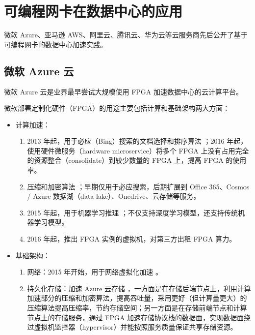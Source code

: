 \section{可编程网卡在数据中心的应用}
\label{background:sec:application}

微软 Azure、亚马逊 AWS、阿里云、腾讯云、华为云等云服务商先后公开了基于可编程网卡的数据中心加速实践。

\subsection{微软 Azure 云}

微软 Azure 云是业界最早尝试大规模使用 FPGA 加速数据中心的云计算平台。

微软部署定制化硬件（FPGA）的用途主要包括计算和基础架构两大方面：

\begin{itemize}
	\item 计算加速：
	\begin{enumerate}
		\item 2013 年起，用于必应（Bing）搜索的文档选择和排序算法 \cite{putnam2014reconfigurable}；2016 年起，使用硬件微服务（hardware microservice）将多个 FPGA 上没有占用完全的资源整合（consolidate）到较少数量的 FPGA 上，提高 FPGA 的使用率。
		\item 压缩和加密算法 \cite{a-scalable-high-bandwidth-architecture-for-lossless-compression-on-fpgas}；早期仅用于必应搜索，后期扩展到 Office 365、Cosmos / Azure 数据湖（data lake）、Onedrive、云存储等服务。
		\item 2015 年起，用于机器学习推理 \cite{accelerating-deep-convolutional-neural-networks-using-specialized-hardware,toward-accelerating-deep-learning-scale-using-specialized-hardware-datacenter,serving-dnns-real-time-datacenter-scale-project-brainwave,a-configurable-cloud-scale-dnn-processor-for-real-time-ai}；不仅支持深度学习模型，还支持传统机器学习模型。
		\item 2016 年起，推出 FPGA 实例的虚拟机，对第三方出租 FPGA 算力。
	\end{enumerate}
	\item 基础架构：
	\begin{enumerate}
		\item 网络：2015 年开始，用于网络虚拟化加速 \cite{smartnic}。
		\item 持久化存储：加速 Azure 云存储 \cite{calder2011windows}，一方面是在存储后端节点上，利用计算加速部分的压缩和加密算法，提高吞吐量，采用更好（但计算量更大）的压缩算法提高压缩率，节约存储空间；另一方面是在存储前端节点和计算节点上的存储服务，通过 FPGA 加速存储协议栈的数据面，实现数据面绕过虚拟机监控器（hypervisor）并能按照服务质量保证共享存储资源。
	\end{enumerate}
\end{itemize}


